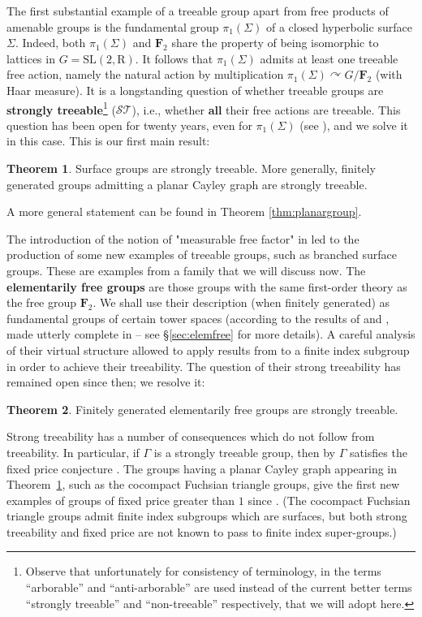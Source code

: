 \documentclass[11pt]{amsart}
\theoremstyle{definition}
\newtheorem{thmintro}{Theorem}
\theoremstyle{plain}
\newcommand{\<}{\langle}
\renewcommand{\>}{\rangle}
\newcommand{\actson}{\curvearrowright}
\newcommand{\FF}{\mathbf{F}}
\newcommand{\R}{\bm{\mathrm{R}}}
\newcommand{\STreeable}{\bm{\mathscr{ST}}}
\newcommand{\define}[1]{\textbf{#1}}
\newcommand{\pmp}{\text{p.m.p.}}
\begin{document}
The first substantial example of a treeable group apart from free products of amenable groups is the fundamental group $\pi_1(\Sigma)$ of a closed hyperbolic surface $\Sigma$.
Indeed, both $\pi _1 (\Sigma )$ and $\FF_2$ share the property of being isomorphic to lattices in $G=\mathrm{SL}(2, \R)$.
It follows that $\pi_1(\Sigma)$ admits at least one treeable free action, namely the natural action by multiplication $\pi_1(\Sigma)\actson G/\FF _2$ (with Haar measure).
It is a longstanding question of  \cite[Question VI.2]{Gab00a} whether treeable groups are \define{strongly treeable}\footnote{Observe that unfortunately for consistency of terminology, in \cite{Gab00a} the terms ``arborable'' and ``anti-arborable''
are used instead of the current better terms ``strongly treeable'' and ``non-treeable'' respectively, that we will adopt here.} ($\STreeable$), i.e., whether \textbf{all} their free {\pmp} actions are treeable. This question has been open for twenty years, even for $\pi_1(\Sigma)$ (see \cite[Question p. 176]{Gab02b}), and we solve it in this case. This is our first main result:
\begin{thmintro}
\label{th-intro surface + planar Cayley graphs}
Surface groups are strongly treeable.
More generally, finitely generated groups admitting a planar Cayley graph are strongly treeable.
\end{thmintro}

A more general statement can be found in Theorem \ref{thm:planargroup}.

The introduction of the notion of "measurable free factor" in \cite{Ga05} led to the production of some new examples of treeable groups, such as branched surface groups. These are examples from a family that we will discuss now. The \define{elementarily free groups} are those groups with the same first-order theory as the free group $\FF_2$.
We shall use their description (when finitely generated) as fundamental groups of certain tower spaces (according to the results of \cite{SeVI} and \cite{KhM1},
made utterly complete in \cite{Guirardel-Levitt-Sklinos-2020} -- see \S\ref{sec:elemfree} for more details).
A careful analysis of their virtual structure allowed \cite{BTW-07} to apply results from \cite{Ga05} to a finite index subgroup in order to achieve their treeability. The question of their strong treeability has remained open since then; we resolve it:
%
\begin{thmintro}
\label{th-intro lement free groups}
Finitely generated elementarily free groups are strongly treeable.
\end{thmintro}
 Strong treeability has a number of consequences which do not follow from treeability. In particular, if $\Gamma$ is a strongly treeable group, then by \cite[Prop. VI.21]{Gab00a}
$\Gamma$ satisfies the fixed price conjecture \cite[Question I.8]{Gab00a}. The groups having a planar Cayley graph appearing in Theorem~\ref{th-intro surface + planar Cayley graphs}, such as the cocompact Fuchsian triangle groups, give the first new examples of groups of fixed price greater than $1$ since \cite{Gab00a}.
(The cocompact Fuchsian triangle groups admit finite index subgroups which are surfaces, but both strong treeability and fixed price are not known to pass to finite index super-groups.)
\end{document}
